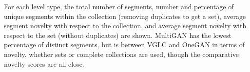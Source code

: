 \begin{table}[t!]
\caption{\label{tab:setnovelty} Distinct Segments By Type}
{\small For each level type, the total number of segments,
number and percentage of unique segments within the collection (removing duplicates to get a set),
average segment novelty with respect to the collection, and average segment novelty with respect to the set (without duplicates) are shown.
MultiGAN has the lowest percentage of
distinct segments, but is between VGLC and OneGAN in terms of novelty, whether sets or complete collections are used, though the comparative novelty scores are all close.}


\centering
{}
\end{table}


